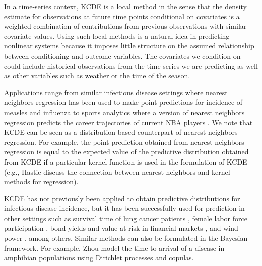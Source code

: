 \documentclass[times, doublespace]{simauth}\usepackage[]{graphicx}\usepackage[]{color}
\begin{document}
In a time-series context, KCDE is a local method in the sense that the density
estimate for observations at future time points conditional on covariates is a weighted
combination of contributions from previous observations with
similar covariate values.  Using such local methods is a natural idea in predicting
nonlinear systems because it imposes little structure on the assumed
relationship between conditioning and outcome variables.
The covariates we condition on could include historical observations from the time
series we are predicting as well as other variables such as weather or
the time of the season.

Applications range from similar infectious disease settings where nearest neighbors
regression has been used to make point predictions for incidence of
measles \cite{sugihara1990nonlinearForecasting} and
influenza \cite{viboud2003predictionInfluenzaMoA} to sports analytics
where a version of nearest neighbors regression predicts the career trajectories
of current NBA players \cite{SilverCARMELOPrediction}.
We note that KCDE can be seen as a distribution-based counterpart of nearest neighbors regression.
For example, the point prediction
obtained from nearest neighbors regression is equal to the expected value of the predictive distribution
obtained from KCDE if a particular kernel function is used in the formulation of
KCDE ({e.g.}, Hastie \etal \cite{HastieTibshiraniESL} discuss the connection
between nearest neighbors and kernel methods for regression).

KCDE has not previously been applied to obtain predictive distributions for
infectious disease incidence, but it has been successfully used for prediction in other settings such as survival
time of lung cancer patients \cite{hall2004crossvalidationKCDE}, female
labor force participation \cite{hall2004crossvalidationKCDE}, bond yields
and value at risk in financial markets \cite{fan2004crossvalidationKCDE},
and wind power \cite{jeon2012KCDEWindPower}, among others.  Similar methods
can also be formulated in the Bayesian framework.  For example, Zhou \etal
\cite{zhou2015DirichletProcessCopulaAmphibianDiseaseArrival} model the time to
arrival of a disease in amphibian populations using Dirichlet processes and copulas.
\end{document}
